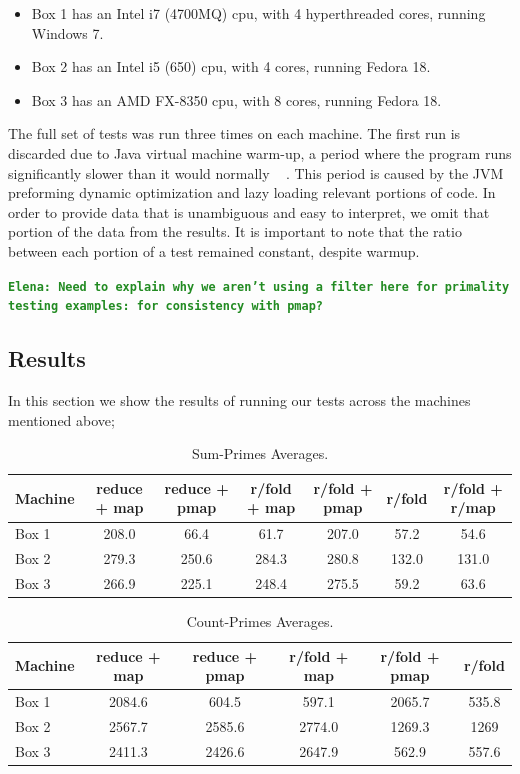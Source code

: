 \documentclass[12pt]{article}
\newcommand{\comment}[1]{{\bf \tt  {#1}}}
\newcommand{\emcomment}[1]{\textcolor{ForestGreen}{\comment{Elena: {#1}}}}
\begin{document}
\begin{itemize}
 \item 
 Box 1 has an Intel i7 (4700MQ) cpu, with 4 hyperthreaded cores, running Windows 7.
 \item
 Box 2 has an Intel i5 (650) cpu, with 4 cores, running Fedora 18.
 \item
 Box 3 has an AMD FX-8350 cpu, with 8 cores, running Fedora 18. 
 \end{itemize}
  
The full set of tests was run three times on each machine. The first run is discarded due to Java virtual machine warm-up, a period where the program runs significantly slower than it would normally ~\cite{Blackburn:2008} . This period is caused by the JVM preforming dynamic optimization and lazy loading relevant portions of code. In order to provide data that is unambiguous and easy to interpret, we omit that portion of the data from the results. It is important to note that the ratio between each portion of a test remained constant, despite warmup.

\emcomment{Need to explain why we aren't using a filter here for primality testing examples: for consistency with pmap?}

\subsection{Results}\label{sec:results}
In this section we show the results of running our tests across the machines mentioned above;

\begin{table}[h!]
\begin{center}
\begin{tabular}{|l|c|c|c|c|c|c|}
\hline
Machine & reduce + map & reduce + pmap & r/fold + map & r/fold + pmap & r/fold & r/fold + r/map \\
\hline
Box 1 & 208.0 & 66.4 & 61.7 & 207.0 & 57.2 &  54.6 \\
Box 2 & 279.3 & 250.6 & 284.3 & 280.8 & 132.0 & 131.0 \\
Box 3 & 266.9 & 225.1 & 248.4 & 275.5 & 59.2 & 63.6 \\
\hline
\end{tabular}
\end{center}
\caption{Sum-Primes Averages.}\label{table:sum-primes}
\end{table}

\begin{table}[h!]
\begin{center}
\begin{tabular}{|l|c|c|c|c|c|}
\hline
Machine & reduce + map & reduce + pmap & r/fold + map & r/fold + pmap & r/fold\\
\hline
Box 1 & 2084.6 & 604.5 & 597.1 & 2065.7 & 535.8\\
Box 2 & 2567.7 & 2585.6 & 2774.0 & 1269.3 & 1269 \\
Box 3 & 2411.3 & 2426.6 & 2647.9 & 562.9 & 557.6\\
\hline
\end{tabular}
\end{center}
\caption{Count-Primes Averages.}\label{table:sum-primes}
\end{table}
\end{document}
